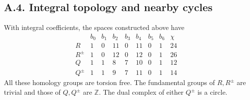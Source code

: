 \subsection{A.4. Integral topology and nearby cycles}

\begin{proposition}\label{push:src:A.4.1}\label{push:A41}
With integral coefficients, the spaces constructed above have
\[
\begin{array}{c|rrrrrrr|r}
&b_0&b_1&b_2&b_3&b_4&b_5&b_6&\chi\\\hline
R&1&0&11&0&11&0&1&24\\
R^\pm&1&0&12&0&12&0&1&26\\
Q&1&1&8&7&10&0&1&12\\
Q^\pm&1&1&9&7&11&0&1&14
\end{array}
\]
All these homology groups are torsion free. The fundamental
groups of $R,R^\pm$ are trivial and those of $Q,Q^\pm$ are
$\mathbb Z$. The dual complex of either $Q^\pm$ is a circle.
\end{proposition}

